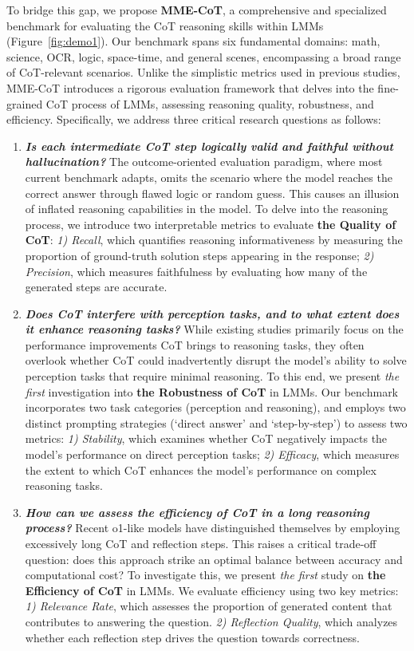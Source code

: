 To bridge this gap, we propose \textbf{MME-CoT}, a comprehensive and specialized benchmark for evaluating the CoT reasoning skills within LMMs (Figure~\ref{fig:demo1}). Our benchmark spans six fundamental domains: math, science, OCR, logic, space-time, and general scenes, encompassing a broad range of CoT-relevant scenarios.
Unlike the simplistic metrics used in previous studies, MME-CoT introduces a rigorous evaluation framework that delves into the fine-grained CoT process of LMMs, assessing reasoning quality, robustness, and efficiency. Specifically, we address three critical research questions as follows:

\begin{enumerate}
    \item \textit{\textbf{Is each intermediate CoT step logically valid and faithful without hallucination?}}
    The outcome-oriented evaluation paradigm, where most current benchmark adapts, omits the scenario where the model reaches the correct answer through flawed logic or random guess. This causes an illusion of inflated reasoning capabilities in the model. To delve into the reasoning process, we introduce two interpretable metrics to evaluate \textbf{the Quality of CoT}: \textit{1) Recall}, which quantifies reasoning informativeness by measuring the proportion of ground-truth solution steps appearing in the response; \textit{2) Precision}, which measures faithfulness by evaluating how many of the generated steps are accurate. 

    \item \textit{\textbf{Does CoT interfere with perception tasks, and to what extent does it enhance reasoning tasks?}}
    While existing studies primarily focus on the performance improvements CoT brings to reasoning tasks, they often overlook whether CoT could inadvertently disrupt the model’s ability to solve perception tasks that require minimal reasoning.
    To this end, we present \textit{the first} investigation into \textbf{the Robustness of CoT} in LMMs. Our benchmark incorporates two task categories (perception and reasoning), and employs two distinct prompting strategies (`direct answer' and `step-by-step') to assess two metrics:
    \textit{1) Stability}, which examines whether CoT negatively impacts the model’s performance on direct perception tasks;
    \textit{2) Efficacy}, which measures the extent to which CoT enhances the model’s performance on complex reasoning tasks.

    
    \item \textit{\textbf{How can we assess the efficiency of CoT in a long reasoning process?}}
    Recent o1-like models have distinguished themselves by employing excessively long CoT and reflection steps. This raises a critical trade-off question: does this approach strike an optimal balance between accuracy and computational cost?
    To investigate this, we present \textit{the first} study on \textbf{the Efficiency of CoT} in LMMs. We evaluate efficiency using two key metrics:
    \textit{1) Relevance Rate}, which assesses the proportion of generated content that contributes to answering the question.
    \textit{2) Reflection Quality}, which analyzes whether each reflection step drives the question towards correctness. 



\end{enumerate}

